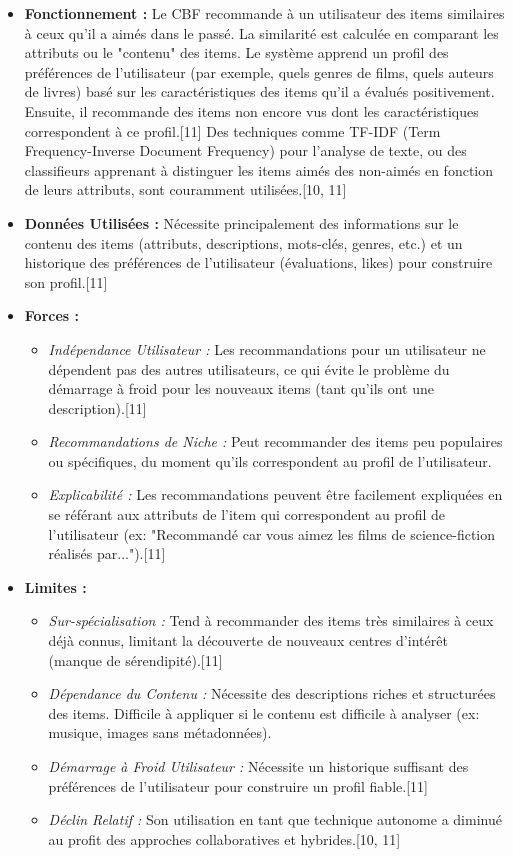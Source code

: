 \documentclass[11pt,a4paper]{article}
\begin{document}
\begin{itemize}
    \item \textbf{Fonctionnement :} Le CBF recommande à un utilisateur des items similaires à ceux qu'il a aimés dans le passé. La similarité est calculée en comparant les attributs ou le "contenu" des items. Le système apprend un profil des préférences de l'utilisateur (par exemple, quels genres de films, quels auteurs de livres) basé sur les caractéristiques des items qu'il a évalués positivement. Ensuite, il recommande des items non encore vus dont les caractéristiques correspondent à ce profil.[11] Des techniques comme TF-IDF (Term Frequency-Inverse Document Frequency) pour l'analyse de texte, ou des classifieurs apprenant à distinguer les items aimés des non-aimés en fonction de leurs attributs, sont couramment utilisées.[10, 11]
    \item \textbf{Données Utilisées :} Nécessite principalement des informations sur le contenu des items (attributs, descriptions, mots-clés, genres, etc.) et un historique des préférences de l'utilisateur (évaluations, likes) pour construire son profil.[11]
    \item \textbf{Forces :}
        \begin{itemize}
            \item \textit{Indépendance Utilisateur :} Les recommandations pour un utilisateur ne dépendent pas des autres utilisateurs, ce qui évite le problème du démarrage à froid pour les nouveaux items (tant qu'ils ont une description).[11]
            \item \textit{Recommandations de Niche :} Peut recommander des items peu populaires ou spécifiques, du moment qu'ils correspondent au profil de l'utilisateur.
            \item \textit{Explicabilité :} Les recommandations peuvent être facilement expliquées en se référant aux attributs de l'item qui correspondent au profil de l'utilisateur (ex: "Recommandé car vous aimez les films de science-fiction réalisés par...").[11]
        \end{itemize}
    \item \textbf{Limites :}
        \begin{itemize}
            \item \textit{Sur-spécialisation :} Tend à recommander des items très similaires à ceux déjà connus, limitant la découverte de nouveaux centres d'intérêt (manque de sérendipité).[11]
            \item \textit{Dépendance du Contenu :} Nécessite des descriptions riches et structurées des items. Difficile à appliquer si le contenu est difficile à analyser (ex: musique, images sans métadonnées).
            \item \textit{Démarrage à Froid Utilisateur :} Nécessite un historique suffisant des préférences de l'utilisateur pour construire un profil fiable.[11]
            \item \textit{Déclin Relatif :} Son utilisation en tant que technique autonome a diminué au profit des approches collaboratives et hybrides.[10, 11]
        \end{itemize}
\end{itemize}
\end{document}
